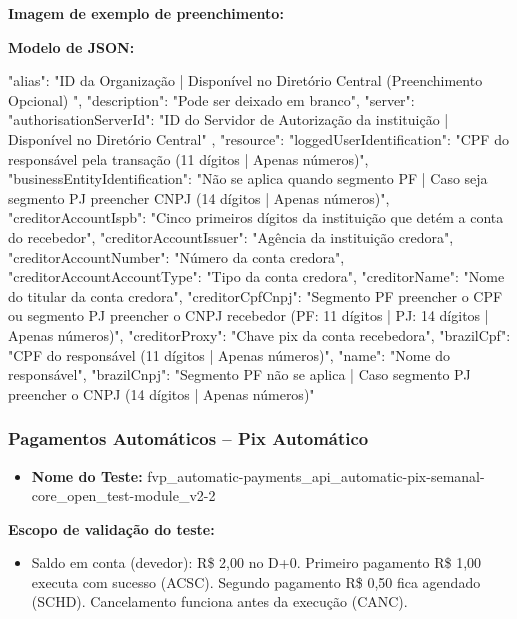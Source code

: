 \textbf{Imagem de exemplo de preenchimento:}

\begin{figure}[H]
    \centering
    \label{fig:pagamentos}
\end{figure}

\textbf{Modelo de JSON:}

\begin{codeblock}
{
    "alias": "ID da Organização | Disponível no Diretório Central (Preenchimento Opcional) ",
    "description": "Pode ser deixado em branco",
    "server": {
        "authorisationServerId": "ID do Servidor de Autorização da instituição  | Disponível no Diretório Central"
    },
    "resource": {
        "loggedUserIdentification": "CPF do responsável pela transação (11 dígitos | Apenas números)",
        "businessEntityIdentification": "Não se aplica quando segmento PF | Caso seja segmento PJ preencher CNPJ (14 dígitos | Apenas números)",
        "creditorAccountIspb": "Cinco primeiros dígitos da instituição que detém a conta do recebedor",
        "creditorAccountIssuer": "Agência da instituição credora",
        "creditorAccountNumber": "Número da conta credora",
        "creditorAccountAccountType": "Tipo da conta credora",
        "creditorName": "Nome do titular da conta credora",
        "creditorCpfCnpj": "Segmento PF preencher o CPF ou segmento PJ preencher o CNPJ recebedor (PF: 11 dígitos | PJ: 14 dígitos | Apenas números)",
        "creditorProxy": "Chave pix da conta recebedora",
        "brazilCpf": "CPF do responsável (11 dígitos | Apenas números)",
        "name": "Nome do responsável",
        "brazilCnpj": "Segmento PF não se aplica | Caso segmento PJ preencher o CNPJ (14 dígitos | Apenas números)"
    }
}
\end{codeblock}

\subsubsection{Pagamentos Automáticos – Pix Automático}
\begin{itemize}
    \item \textbf{Nome do Teste:} fvp\_automatic-payments\_api\_automatic-pix-semanal-core\_open\_test-module\_v2-2
\end{itemize}

\textbf{Escopo de validação do teste:}
\begin{itemize}
    \item Saldo em conta (devedor): R\$ 2,00 no D+0. Primeiro pagamento R\$ 1,00 executa com sucesso (ACSC). Segundo pagamento R\$ 0,50 fica agendado (SCHD). Cancelamento funciona antes da execução (CANC).
\end{itemize}

